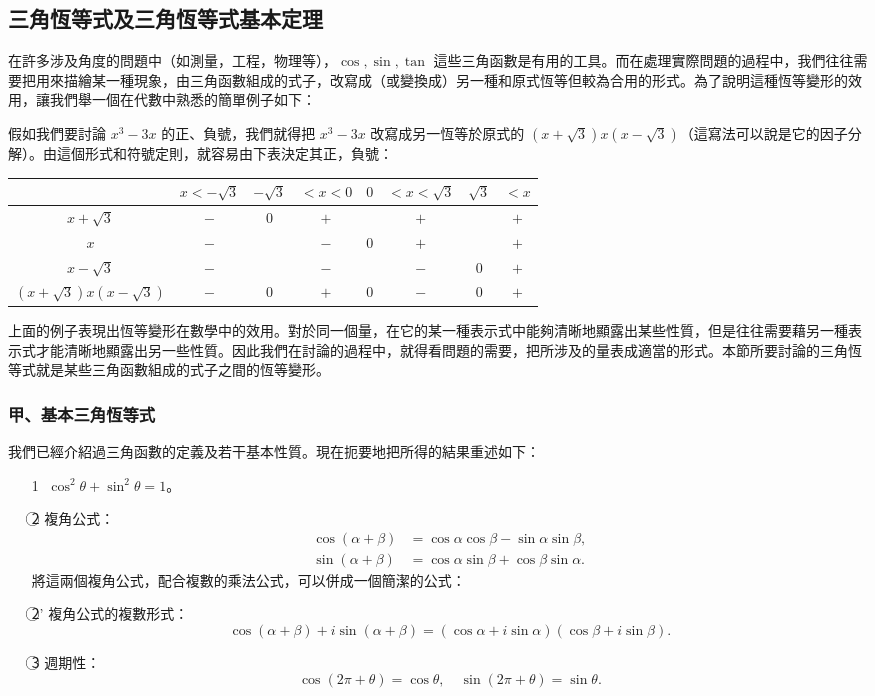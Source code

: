 \subsection{三角恆等式及三角恆等式基本定理}\label{sec:b4-5-3}

在許多涉及角度的問題中（如測量，工程，物理等），$\cos, \sin, \tan$ 這些三角函數是有用的工具。而在處理實際問題的過程中，我們往往需要把用來描繪某一種現象，由三角函數組成的式子，改寫成（或變換成）另一種和原式恆等但較為合用的形式。為了說明這種恆等變形的效用，讓我們舉一個在代數中熟悉的簡單例子如下：

假如我們要討論 $x^3-3x$ 的正、負號，我們就得把 $x^3-3x$ 改寫成另一恆等於原式的 $(x+\sqrt{3})x(x-\sqrt{3})$（這寫法可以說是它的因子分解）。由這個形式和符號定則，就容易由下表決定其正，負號：

\begin{center}
\begin{tabular}{|c|ccccccc|}
\hline
& $x < -\sqrt{3}$ & $-\sqrt{3}$ & $< x < 0$ & $0$ & $< x < \sqrt{3}$ & $\sqrt{3}$ & $< x$ \\ \hline
$x+\sqrt{3}$ & $-$ & $0$ & $+$ & & $+$ & & $+$ \\
$x$ & $-$ & & $-$ & $0$ & $+$ & & $+$ \\
$x-\sqrt{3}$ & $-$ & & $-$ & & $-$ & $0$ & $+$ \\ \hline
$(x+\sqrt{3})x(x-\sqrt{3})$ & $-$ & $0$ & $+$ & $0$ & $-$ & $0$ & $+$ \\ \hline
\end{tabular}
\end{center}

上面的例子表現出恆等變形在數學中的效用。對於同一個量，在它的某一種表示式中能夠清晰地顯露出某些性質，但是往往需要藉另一種表示式才能清晰地顯露出另一些性質。因此我們在討論的過程中，就得看問題的需要，把所涉及的量表成適當的形式。本節所要討論的三角恆等式就是某些三角函數組成的式子之間的恆等變形。

\subsubsection*{甲、基本三角恆等式}

我們已經介紹過三角函數的定義及若干基本性質。現在扼要地把所得的結果重述如下：
\begin{itemize}
  \item[\textcircled{1}] $\cos^2\theta+\sin^2\theta = 1$。
  \item[\textcircled{2}] 複角公式：
  \begin{align*}
  \cos(\alpha+\beta) &= \cos\alpha\cos\beta - \sin\alpha\sin\beta, \\
  \sin(\alpha+\beta) &= \cos\alpha\sin\beta + \cos\beta\sin\alpha.
  \end{align*}
  將這兩個複角公式，配合複數的乘法公式，可以併成一個簡潔的公式：
  \item[\textcircled{2}'] 複角公式的複數形式：
  \[
  \cos(\alpha+\beta)+i\sin(\alpha+\beta) = (\cos\alpha+i\sin\alpha)(\cos\beta+i\sin\beta).
  \]
  \item[\textcircled{3}] 週期性：
  \[
  \cos(2\pi+\theta) = \cos\theta, \quad \sin(2\pi+\theta) = \sin\theta.
  \]
\end{itemize}

